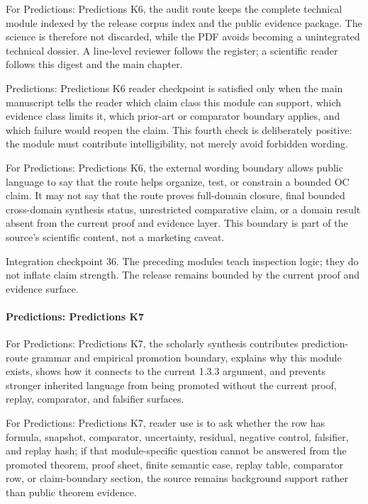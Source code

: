 For Predictions: Predictions K6, the audit route keeps the complete technical module indexed by the release corpus index and the public evidence package. The science is therefore not discarded, while the PDF avoids becoming a unintegrated technical dossier. A line-level reviewer follows the register; a scientific reader follows this digest and the main chapter.


Predictions: Predictions K6 reader checkpoint is satisfied only when the main manuscript tells the reader which claim class this module can support, which evidence class limits it, which prior-art or comparator boundary applies, and which failure would reopen the claim. This fourth check is deliberately positive: the module must contribute intelligibility, not merely avoid forbidden wording.


For Predictions: Predictions K6, the external wording boundary allows public language to say that the route helps organize, test, or constrain a bounded OC claim. It may not say that the route proves full-domain closure, final bounded cross-domain synthesis status, unrestricted comparative claim, or a domain result absent from the current proof and evidence layer. This boundary is part of the source's scientific content, not a marketing caveat.


Integration checkpoint 36. The preceding modules teach inspection logic; they do not inflate claim strength. The release remains bounded by the current proof and evidence surface.


\paragraph{Predictions: Predictions K7}

For Predictions: Predictions K7, the scholarly synthesis contributes prediction-route grammar and empirical promotion boundary, explains why this module exists, shows how it connects to the current 1.3.3 argument, and prevents stronger inherited language from being promoted without the current proof, replay, comparator, and falsifier surfaces.


For Predictions: Predictions K7, reader use is to ask whether the row has formula, snapshot, comparator, uncertainty, residual, negative control, falsifier, and replay hash; if that module-specific question cannot be answered from the promoted theorem, proof sheet, finite semantic case, replay table, comparator row, or claim-boundary section, the source remains background support rather than public theorem evidence.


